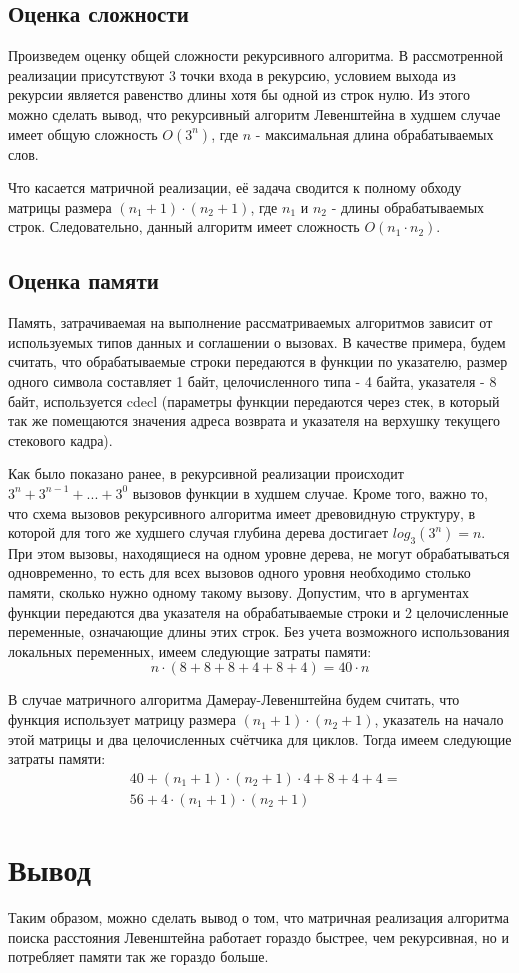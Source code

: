 \subsection{Оценка сложности}
Произведем оценку общей сложности рекурсивного алгоритма. В рассмотренной реализации присутствуют 3 точки входа в рекурсию, условием выхода из рекурсии является равенство длины хотя бы одной из строк нулю. Из этого можно сделать вывод, что рекурсивный алгоритм Левенштейна в худшем случае имеет общую сложность \(O(3^n)\), где \(n\) - максимальная длина обрабатываемых слов.

Что касается матричной реализации, её задача сводится к полному обходу матрицы размера \((n_1+1)\cdot{}(n_2+1)\), где \(n_1\) и \(n_2\) - длины обрабатываемых строк. Следовательно, данный алгоритм имеет сложность \(O(n_1\cdot{}n_2)\).

\subsection{Оценка памяти}
Память, затрачиваемая на выполнение рассматриваемых алгоритмов зависит от используемых типов данных и соглашении о вызовах. В качестве примера, будем считать, что обрабатываемые строки передаются в функции по указателю, размер одного символа составляет 1 байт, целочисленного типа - 4 байта, указателя - 8 байт, используется cdecl (параметры функции передаются через стек, в который так же помещаются значения адреса возврата и указателя на верхушку текущего стекового кадра).

Как было показано ранее, в рекурсивной реализации происходит \(3^n + 3^{n-1} + ... + 3^0\) вызовов функции в худшем случае. Кроме того, важно то, что схема вызовов рекурсивного алгоритма имеет древовидную структуру, в которой для того же худшего случая глубина дерева достигает \(log_3(3^n) = n\). При этом вызовы, находящиеся на одном уровне дерева, не могут обрабатываться одновременно, то есть для всех вызовов одного уровня необходимо столько памяти, сколько нужно одному такому вызову. Допустим, что в аргументах функции передаются два указателя на обрабатываемые строки и 2 целочисленные переменные, означающие длины этих строк. Без учета возможного использования локальных переменных, имеем следующие затраты памяти:
\begin{equation}
    n \cdot{} (8+8 + 8+4 + 8+4) = 40 \cdot n
\end{equation}

В случае матричного алгоритма Дамерау-Левенштейна будем считать, что функция использует матрицу размера \((n_1+1)\cdot{}(n_2+1)\), указатель на начало этой матрицы и два целочисленных счётчика для циклов. Тогда имеем следующие затраты памяти:
\begin{equation}
    \begin{split}
    & 40 + (n_1+1)\cdot{}(n_2+1)\cdot{}4 + 8 + 4 + 4 = \\
    & 56 + 4\cdot{}(n_1+1)\cdot{}(n_2+1)
    \end{split}
\end{equation}

\section{Вывод}
Таким образом, можно сделать вывод о том, что матричная реализация алгоритма поиска расстояния Левенштейна работает гораздо быстрее, чем рекурсивная, но и потребляет памяти так же гораздо больше.

